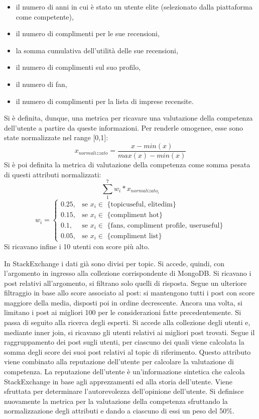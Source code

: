 \begin{itemize}
\item il numero di anni in cui è stato un utente elite (selezionato dalla piattaforma come competente),
\item il numero di complimenti per le sue recensioni,
\item la somma cumulativa dell'utilità delle sue recensioni,
\item il numero di complimenti sul suo profilo,
\item il numero di fan,
\item il numero di complimenti per la lista di imprese recensite.
\end{itemize}
Si è definita, dunque, una metrica per ricavare una valutazione della competenza dell'utente a partire da queste informazioni. Per renderle omogenee, esse sono state normalizzate nel range [0,1]:
\begin{equation*}
x_{normalizzato} = \frac{x - min(x)}{max(x)-min(x)}
\end{equation*}
Si è poi definita la metrica di valutazione della competenza come somma pesata di questi attributi normalizzati:
\begin{equation*}
\sum_{1}^{7}{w_i*x_{{normalizato}_i}}
\end{equation*}
\begin{equation*}
w_i=\begin{cases} 0.25, & \mbox{se } x_i \in \mbox{ \{topicuseful, elitedim\}}\\ 0.15, & \mbox{se } x_i \in \mbox{ \{compliment hot\}}\\ 0.1, & \mbox{se } x_i \in \mbox{ \{fans, compliment profile, useruseful\}} \\ 0.05, & \mbox{se } x_i \in \mbox{ \{compliment list\}}
\end{cases}
\end{equation*}
Si ricavano infine i 10 utenti con score più alto.\par
In StackExchange i dati già sono divisi per topic. Si accede, quindi, con l'argomento in ingresso alla collezione corrispondente di MongoDB. Si ricavano i post relativi all'argomento, si filtrano solo quelli di risposta. Segue un ulteriore filtraggio in base allo score associato al post: si mantengono tutti i post con score maggiore della media, disposti poi in ordine decrescente. Ancora una volta, si limitano i post ai migliori 100 per le considerazioni fatte precedentemente. Si passa di seguito alla ricerca degli esperti. Si accede alla collezione degli utenti e, mediante inner join, si ricavano gli utenti relativi ai migliori post trovati. Segue il raggruppamento dei post sugli utenti, per ciascuno dei quali viene calcolata la somma degli score dei suoi post relativi al topic di riferimento. Questo attributo viene combinato alla reputazione dell'utente per calcolare la valutazione di competenza. La reputazione dell'utente è un'informazione sintetica che calcola StackExchange in base agli apprezzamenti ed alla storia dell'utente. Viene sfruttata per determinare l'autorevolezza dell'opinione dell'utente. Si definisce nuovamente la metrica per la valutazione della competenza sfruttando la normalizzazione degli attributi e dando a ciascuno di essi un peso del 50\%.

